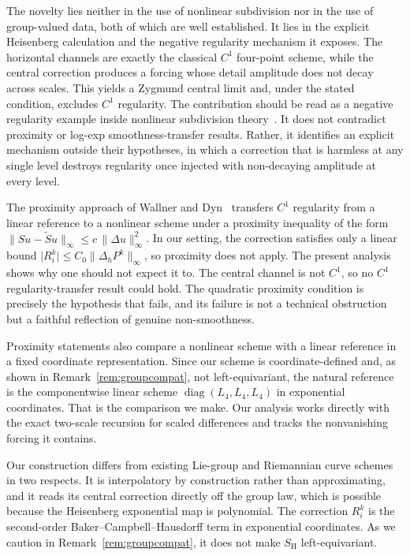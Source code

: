 \documentclass{article}
\theoremstyle{plain}
\theoremstyle{definition}
\newcommand{\SH}{S_{\mathrm{H}}}
\newcommand{\Lop}{L_4}
\newcommand{\norm}[1]{\lVert #1 \rVert}
\newcommand{\abs}[1]{\lvert #1 \rvert}
\newcommand{\Dh}{\Delta_h}
\DeclareMathOperator{\diag}{diag}
\begin{document}
The novelty lies neither in the use of nonlinear subdivision nor in the use of
group-valued data, both of which are well established. It lies in the explicit
Heisenberg calculation and the negative regularity mechanism it exposes. The
horizontal channels are exactly the classical $C^1$ four-point scheme, while the
central correction produces a forcing whose detail amplitude does not decay
across scales. This yields a Zygmund central limit and, under the stated
condition, excludes $C^1$ regularity. The contribution should be read as a
negative regularity example inside nonlinear subdivision
theory~\cite{WallnerDyn05, Grohs10prox, WallnerNYGrohs07, XieYu10}. It does not
contradict proximity or log-exp smoothness-transfer results. Rather, it
identifies an explicit mechanism outside their hypotheses, in which a correction
that is harmless at any single level destroys regularity once injected
with non-decaying amplitude at every level.

\medskip
The proximity approach of Wallner and Dyn~\cite{WallnerDyn05} transfers $C^1$
regularity from a linear reference to a nonlinear scheme under a proximity
inequality of the form $\norm{Su - \tilde{S}u}_\infty \leq c\,\norm{\Delta
u}_\infty^2$. In our setting, the correction satisfies only a linear bound
$\abs{R_i^k} \leq C_0\norm{\Dh P^k}_\infty$, so proximity does not apply. The
present analysis shows why one should not expect it to. The central channel is
not $C^1$, so no $C^1$ regularity-transfer result could hold. The quadratic
proximity condition is precisely the hypothesis that fails, and its failure is
not a technical obstruction but a faithful reflection of genuine non-smoothness.

Proximity statements also compare a nonlinear scheme with a linear reference in
a fixed coordinate representation. Since our scheme is coordinate-defined and,
as shown in Remark~\ref{rem:groupcompat}, not left-equivariant, the natural
reference is the componentwise linear scheme $\diag(\Lop,\Lop,\Lop)$ in
exponential coordinates. That is the comparison we make. Our analysis works
directly with the exact two-scale recursion for scaled differences and tracks
the nonvanishing forcing it contains.

Our construction differs from existing Lie-group and Riemannian curve schemes in
two respects. It is interpolatory by construction rather than approximating, and
it reads its central correction directly off the group law, which is possible
because the Heisenberg exponential map is polynomial. The correction $R_i^k$ is
the second-order Baker--Campbell--Hausdorff term in exponential coordinates. As
we caution in Remark~\ref{rem:groupcompat}, it does not make $\SH$
left-equivariant.
\end{document}
